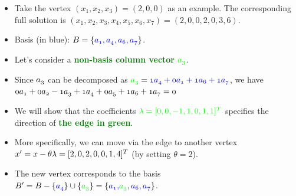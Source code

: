 \documentclass[mathserif]{beamer}
\begin{document}
{\begin{scriptsize}

\begin{itemize}
 \item Take the vertex  $(x_1,x_2,x_3)=(2,0,0)$ as an example. The corresponding full solution is $(x_1,x_2,x_3,x_4,x_5,x_6,x_7) = ( 2, 0, 0, 2, 0, 3, 6 )$.
  \item Basis (in blue): $\mathnormal{B =\{ \textcolor{blue}{a_1, a_4, a_6, a_7} \} }$. 
 \item  Let's consider a \textcolor{green}{\bf non-basis column vector} $\mathnormal{\textcolor{green}{a_{3}}}$. 
 \item  Since $\mathnormal{a_3}$ can be decomposed as  $\mathnormal{\textcolor{green}{a_{3}} = \textcolor{blue}{1 a_{4} + 0 a_{1} + 1 a_{6} + 1 a_{7}}}$,  we have $\mathnormal{ 0 a_{1} + 0 a_{2} - 1 a_{3} + 1 a_{4} + 0 a_{5} + 1a_{6} + 1a_{7} = 0}$
  \item We will show that the coefficients   $\textcolor{green} {\mathnormal{\lambda}= [0, 0, -1, 1, 0, 1, 1 ]^T}$ specifies the direction of  \textcolor{green}{\bf the  edge in green}. 
  \item More specifically, we can move via the edge to another vertex $\mathnormal{x'=x - \theta \lambda} = [ 2,0,2,0,0,1,4]^T$ (by setting $\theta=2$).
  \item The new vertex corresponds to  the basis  $\mathnormal{B' = B-\{\textcolor{blue}{a_4}\} \cup \{\textcolor{green}{a_3}\} =\{ \textcolor{blue}{a_1, } \textcolor{green}{a_3}, \textcolor{blue}{ a_6, a_7} \}}$. 
\end{itemize}
\end{scriptsize}
}
\end{document}
